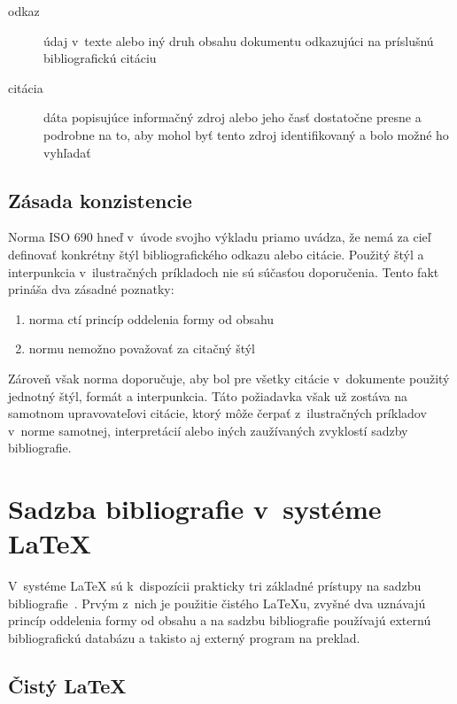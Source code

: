 \documentclass{csbulletin}
\begin{document}
\begin{refsection}
\begin{description}
\item[odkaz] údaj v~texte alebo iný druh obsahu dokumentu odkazujúci
  na príslušnú bibliografickú citáciu
\item[citácia] dáta popisujúce informačný zdroj alebo jeho časť
  dostatočne presne a podrobne na to, aby mohol byť tento zdroj
  identifikovaný a bolo možné ho vyhľadať
\end{description}

\subsection{Zásada konzistencie}

Norma ISO 690 hneď v~úvode svojho výkladu priamo uvádza, že nemá za
cieľ definovať konkrétny štýl bibliografického odkazu alebo citácie.
Použitý štýl a interpunkcia v~ilustračných príkladoch nie sú súčasťou
doporučenia. Tento fakt prináša dva zásadné poznatky:

\begin{enumerate}
\item norma ctí princíp oddelenia formy od obsahu
\item normu nemožno považovať za citačný štýl~\cite{Hala2013}
\end{enumerate}

\noindent Zároveň však norma doporučuje, aby bol pre všetky citácie
v~dokumente použitý jednotný štýl, formát a interpunkcia. Táto
požiadavka však už zostáva na samotnom upravovateľovi citácie, ktorý
môže čerpať z~ilustračných príkladov v~norme samotnej, interpretácií
alebo iných zaužívaných zvyklostí sadzby bibliografie.


\section{Sadzba bibliografie v~systéme \LaTeX{}}

V~systéme \LaTeX{} sú k~dispozícii prakticky tri základné prístupy na
sadzbu bibliografie~\cite{talbot2013}. Prvým z~nich je použitie
čistého \LaTeX{}u, zvyšné dva uznávajú princíp oddelenia formy od
obsahu a na sadzbu bibliografie používajú externú bibliografickú
databázu a takisto aj externý program na preklad.

\subsection{Čistý \LaTeX}\label{bib:pure:latex}


\end{refsection}
\end{document}
